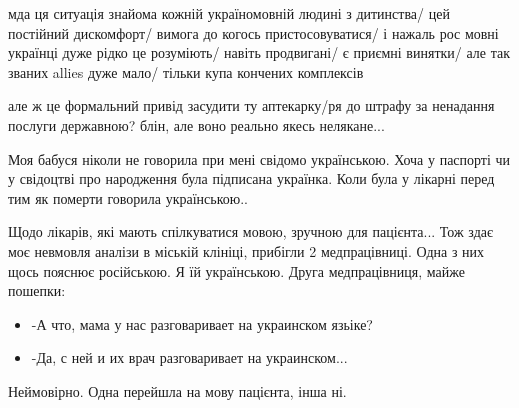\begin{itemize}
мда ця ситуація знайома кожній україномовній людині з дитинства/ цей постійний
дискомфорт/ вимога до когось пристосовуватися/ і нажаль рос мовні українці дуже
рідко це розуміють/ навіть продвигані/ є приємні винятки/ але так званих allies
дуже мало/ тільки купа кончених комплексів


 

але ж це формальний привід засудити ту аптекарку/ря до штрафу за ненадання
послуги державною? блін, але воно реально якесь нелякане...


 

Моя бабуся ніколи не говорила при мені свідомо українською. Хоча у паспорті чи
у свідоцтві про народження була підписана українка. Коли була у лікарні перед
тим як померти говорила українською..

 

Щодо лікарів, які мають спілкуватися мовою, зручною для пацієнта... Тож здає
моє невмовля аналізи в міській клініці, прибігли 2 медпрацівниці. Одна з них
щось пояснює російською. Я їй українською. Друга медпрацівниця, майже пошепки:

\begin{itemize}
  \item -А что, мама у нас разговаривает на украинском язьіке?
  \item -Да, с ней и их врач разговаривает на украинском...
\end{itemize}

Неймовірно. Одна перейшла на мову пацієнта, інша ні.


 


\end{itemize}
